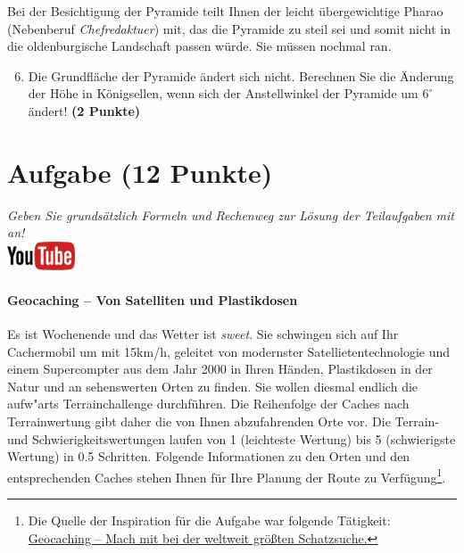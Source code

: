 \documentclass[a4paper, 9pt]{scrartcl}\usepackage[]{graphicx}\usepackage[]{xcolor}
\begin{document}
Bei der Besichtigung der Pyramide teilt Ihnen der leicht {\"u}bergewichtige
Pharao (Nebenberuf \textit{Chefredaktuer}) mit, das die Pyramide zu
steil sei und somit nicht in die oldenburgische Landschaft passen
w{\"u}rde. Sie m{\"u}ssen nochmal ran.

\begin{enumerate}
  \setcounter{enumi}{5}
\item Die Grundfl{\"a}che der Pyramide {\"a}ndert sich nicht. Berechnen Sie die
  {\"A}nderung der H{\"o}he in K{\"o}nigsellen, wenn sich der Anstellwinkel der
  Pyramide um $6^\circ$ {\"a}ndert!  \textbf{(2 Punkte)}
\end{enumerate}



\clearpage

\section{Aufgabe \hfill (12 Punkte)}

\textit{Geben Sie grunds{\"a}tzlich Formeln und Rechenweg zur L{\"o}sung der
  Teilaufgaben mit an!} \\[1Ex]

\hfill\href{https://youtu.be/3LAq3R0rS14}{\includegraphics[width =
  2cm]{img/youtube}} %
\hspace{2Ex}

\paragraph{Geocaching -- Von Satelliten und Plastikdosen}



Es ist Wochenende und das Wetter ist \textit{sweet}. Sie schwingen sich auf
Ihr Cachermobil um mit 15km/h, geleitet von modernster
Satellietentechnologie und einem Supercompter aus dem Jahr 2000 in Ihren
H{\"a}nden, Plastikdosen in der Natur und an sehenswerten Orten zu finden. Sie
wollen diesmal endlich die aufw{"a}rts Terrainchallenge
durchf{\"u}hren. Die Reihenfolge der Caches nach Terrainwertung gibt daher
die von Ihnen abzufahrenden Orte vor. Die Terrain- und
Schwierigkeitswertungen laufen von 1 (leichteste Wertung) bis 5
(schwierigste Wertung) in 0.5 Schritten. Folgende Informationen zu den
Orten und den entsprechenden Caches stehen Ihnen f{\"u}r Ihre Planung der Route
zu Verf{\"u}gung\footnote{Die Quelle der Inspiration
  für die Aufgabe war folgende Tätigkeit:
  \href{https://www.geocaching.com/play}{Geocaching -- Mach mit bei der weltweit größten Schatzsuche.}}.
\end{document}
